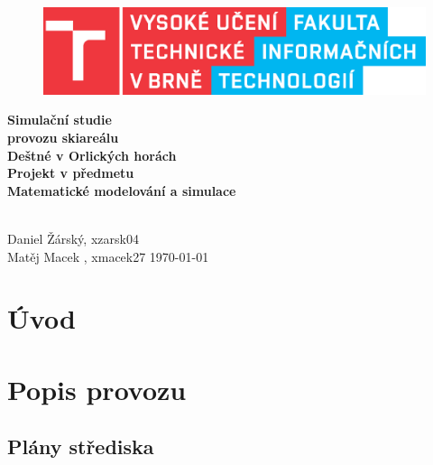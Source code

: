 \documentclass[a4paper, 11pt]{article}\usepackage{times}
\begin{document}
\begin{titlepage}
    \begin{center}
    \begin{figure}[!h]
            \centering
            \includegraphics[scale=0.7]{logo.eps}
        \end{figure}        
    
        \vspace{100px}
    
        \huge{
            \textbf{
                Simulační studie\\ provozu skiareálu \\
                Deštné v Orlických horách\\
            }
        }
        \vspace{40px}
        \large
        \textbf{
            Projekt v předmetu\\
            Matematické modelování a simulace\\
        }
        \vfill
    \end{center}
        \Large{
            \hfill\\
            Daniel Žárský, xzarsk04\\
            Matěj Macek , xmacek27 \hfill \today
        }

\end{titlepage}


\clearpage
\thispagestyle{empty}
	\tableofcontents
\newpage
{}
\setcounter{page}{1}
\section{Úvod}

\section{Popis provozu}
\subsection{Plány střediska}
\end{document}
